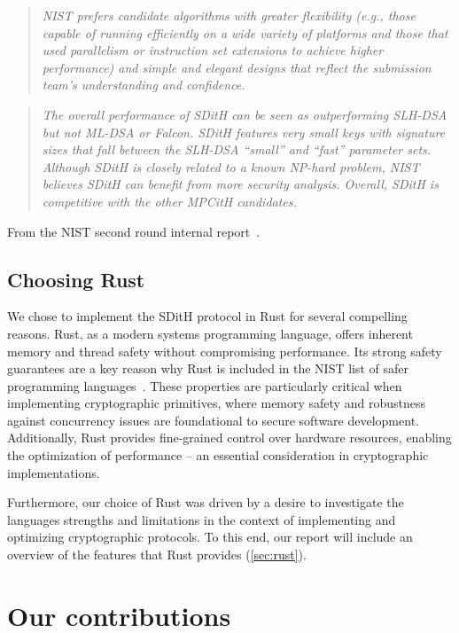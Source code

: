 \documentclass[11pt]{report}
\theoremstyle{definition}
\theoremstyle{plain}
\begin{document}
\begin{quote}
  \textit{NIST prefers candidate algorithms with greater flexibility (e.g., those capable of running efficiently on a wide variety of platforms and those that used parallelism or instruction set extensions to achieve higher performance) and simple and elegant designs that reflect the submission team's understanding and confidence.}
\end{quote}

\begin{quote}
  \textit{The overall performance of SDitH can be seen as outperforming SLH-DSA but not ML-DSA or Falcon. SDitH features very small keys with signature sizes that fall between the SLH-DSA ``small'' and ``fast'' parameter sets. Although SDitH is closely related to a known NP-hard problem, NIST believes SDitH can benefit from more security analysis. Overall, SDitH is competitive with the other MPCitH candidates.}
\end{quote}

From the NIST second round internal report~\cite{alagic2024status}.

\subsection{Choosing Rust}
We chose to implement the SDitH protocol in Rust for several compelling reasons. Rust, as a modern systems programming language, offers inherent memory and thread safety without compromising performance. Its strong safety guarantees\cite{jung2017rustbelt} are a key reason why Rust is included in the NIST list of safer programming languages~\cite{nistsaferlanguages}. These properties are particularly critical when implementing cryptographic primitives, where memory safety and robustness against concurrency issues are foundational to secure software development. Additionally, Rust provides fine-grained control over hardware resources, enabling the optimization of performance -- an essential consideration in cryptographic implementations.

Furthermore, our choice of Rust was driven by a desire to investigate the languages strengths and limitations in the context of implementing and optimizing cryptographic protocols. To this end, our report will include an overview of the features that Rust provides (\autoref{sec:rust}).

\section{Our contributions}
\end{document}
